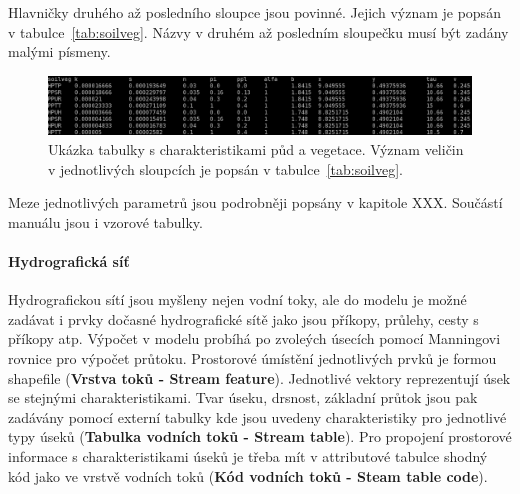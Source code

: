 Hlavničky druhého až posledního sloupce jsou povinné. Jejich význam je popsán v tabulce~\ref{tab:soilveg}. Názvy v druhém až posledním sloupečku musí být zadány malými písmeny.
\begin{figure}
  \centering
  \includegraphics[width=1.0\textwidth]{./img/tabsoilveg.png}
  \caption{Ukázka tabulky s charakteristikami půd a vegetace. Význam veličin v jednotlivých sloupcích je popsán v tabulce~\ref{tab:soilveg}.}
  \label{fig:tabsoilveg}
\end{figure}



Meze jednotlivých parametrů jsou podrobněji popsány v kapitole XXX. 
Součástí manuálu jsou i vzorové tabulky.

\paragraph{Hydrografická síť} \label{sec:vodnitoky}

Hydrografickou sítí jsou myšleny nejen vodní toky, ale do modelu je možné zadávat i prvky dočasné hydrografické sítě jako jsou příkopy, průlehy, cesty s příkopy atp. Výpočet v modelu probíhá po zvoleých úsecích pomocí Manningovi rovnice pro výpočet průtoku. Prostorové úmístění jednotlivých prvků je formou shapefile (\textbf{Vrstva toků - Stream feature}). Jednotlivé vektory reprezentují úsek se stejnými charakteristikami. Tvar úseku, drsnost, základní průtok jsou pak zadávány pomocí externí tabulky kde jsou uvedeny charakteristiky pro jednotlivé typy úseků (\textbf{Tabulka vodních toků - Stream table}). Pro propojení prostorové informace s charakteristikami úseků je třeba mít v attributové tabulce shodný kód jako ve vrstvě vodních toků (\textbf{Kód vodních toků - Steam table code}).
